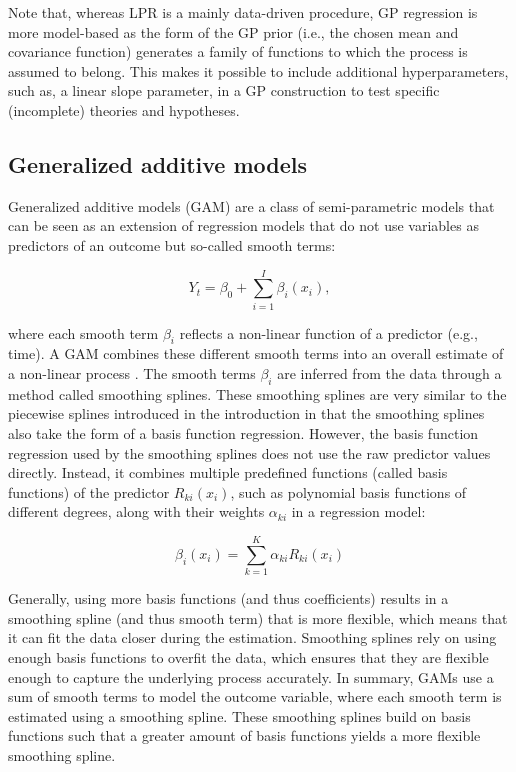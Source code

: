 \documentclass[man, floatsintext]{apa7}
\begin{document}
Note that, whereas LPR is a mainly data-driven procedure, GP regression is more
model-based as the form of the GP prior (i.e., the chosen mean and covariance
function) generates a family of functions to which the process is assumed to
belong. This makes it possible to include additional hyperparameters, such as,
a linear slope parameter, in a GP construction to test specific (incomplete)
theories and hypotheses.

\subsection{Generalized additive models}

Generalized additive models (GAM) are a class of semi-parametric models that
can be seen as an extension of regression models that do not use variables as
predictors of an outcome but so-called smooth terms:

\begin{equation}
  Y_t = \beta_0 + \sum_{i = 1}^{I} \beta_i(x_i),
\end{equation}

where each smooth term $\beta_i$ reflects a non-linear function of a predictor
(e.g., time). A GAM combines these different smooth terms into an overall
estimate of a non-linear process \parencite{wood_generalized_2006,
  wood_inference_2020, hastie_generalized_1999}. The smooth terms $\beta_i$ are
inferred from the data through a method called smoothing splines. These
smoothing splines are very similar to the piecewise splines introduced in the
introduction in that the smoothing splines also take the form of a basis
function regression. However, the basis function regression used by the
smoothing splines does not use the raw predictor values directly. Instead, it
combines multiple predefined functions (called basis functions) of the
predictor $R_{ki}(x_i)$, such as polynomial basis functions of different
degrees, along with their weights $\alpha_{ki}$ in a regression model:

\begin{equation}
  \beta_i(x_i) = \sum^K_{k = 1} \alpha_{ki} R_{ki}(x_i)
\end{equation}

\noindent Generally, using more basis functions (and thus coefficients) results
in a smoothing spline (and thus smooth term) that is more flexible, which means
that it can fit the data closer during the estimation. Smoothing splines rely
on using enough basis functions to overfit the data, which ensures that they
are flexible enough to capture the underlying process accurately. In summary,
GAMs use a sum of smooth terms to model the outcome variable, where each smooth
term is estimated using a smoothing spline. These smoothing splines build on
basis functions such that a greater amount of basis functions yields a more
flexible smoothing spline.
\end{document}
